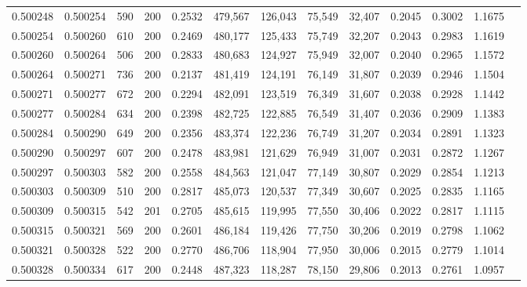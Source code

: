 \begin{tabular}{rrrrrrrrrrrrr}
0.500248 & 0.500254 &   590 & 200 &                                     0.2532 & 479,567 & 126,043 &  75,549 &  32,407 & 0.2045 & 0.3002 & 1.1675 \\
0.500254 & 0.500260 &   610 & 200 &                                     0.2469 & 480,177 & 125,433 &  75,749 &  32,207 & 0.2043 & 0.2983 & 1.1619 \\
0.500260 & 0.500264 &   506 & 200 &                                     0.2833 & 480,683 & 124,927 &  75,949 &  32,007 & 0.2040 & 0.2965 & 1.1572 \\
0.500264 & 0.500271 &   736 & 200 &                                     0.2137 & 481,419 & 124,191 &  76,149 &  31,807 & 0.2039 & 0.2946 & 1.1504 \\
0.500271 & 0.500277 &   672 & 200 &                                     0.2294 & 482,091 & 123,519 &  76,349 &  31,607 & 0.2038 & 0.2928 & 1.1442 \\
0.500277 & 0.500284 &   634 & 200 &                                     0.2398 & 482,725 & 122,885 &  76,549 &  31,407 & 0.2036 & 0.2909 & 1.1383 \\
0.500284 & 0.500290 &   649 & 200 &                                     0.2356 & 483,374 & 122,236 &  76,749 &  31,207 & 0.2034 & 0.2891 & 1.1323 \\
0.500290 & 0.500297 &   607 & 200 &                                     0.2478 & 483,981 & 121,629 &  76,949 &  31,007 & 0.2031 & 0.2872 & 1.1267 \\
0.500297 & 0.500303 &   582 & 200 &                                     0.2558 & 484,563 & 121,047 &  77,149 &  30,807 & 0.2029 & 0.2854 & 1.1213 \\
0.500303 & 0.500309 &   510 & 200 &                                     0.2817 & 485,073 & 120,537 &  77,349 &  30,607 & 0.2025 & 0.2835 & 1.1165 \\
0.500309 & 0.500315 &   542 & 201 &                                     0.2705 & 485,615 & 119,995 &  77,550 &  30,406 & 0.2022 & 0.2817 & 1.1115 \\
0.500315 & 0.500321 &   569 & 200 &                                     0.2601 & 486,184 & 119,426 &  77,750 &  30,206 & 0.2019 & 0.2798 & 1.1062 \\
0.500321 & 0.500328 &   522 & 200 &                                     0.2770 & 486,706 & 118,904 &  77,950 &  30,006 & 0.2015 & 0.2779 & 1.1014 \\
0.500328 & 0.500334 &   617 & 200 &                                     0.2448 & 487,323 & 118,287 &  78,150 &  29,806 & 0.2013 & 0.2761 & 1.0957 \\

\end{tabular}

